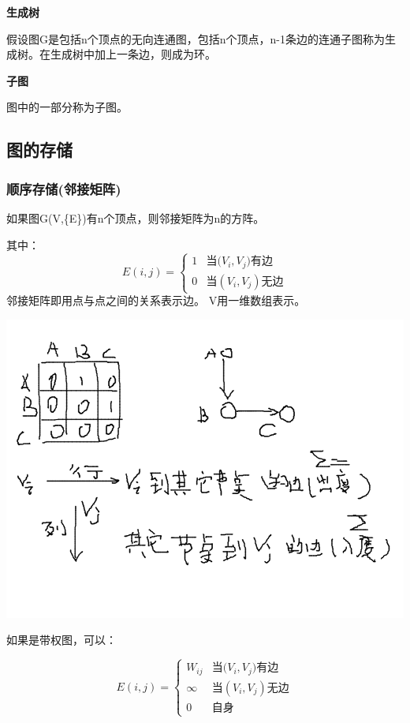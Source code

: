 \documentclass{article}
\begin{document}
		\textbf{生成树}

		假设图G是包括n个顶点的无向连通图，包括n个顶点，n-1条边的连通子图称为生成树。在生成树中加上一条边，则成为环。

		\textbf{子图}

		图中的一部分称为子图。

	\subsection{图的存储}
	\subsubsection{顺序存储(邻接矩阵)}
		如果图G(V,\{E\})有n个顶点，则邻接矩阵为n的方阵。

		其中：
		\[
			E(i,j)=
			\left\{
				\begin{array}{ll}
					1 & \textrm{当($V_i,V_j)$有边}\\
					0 & \textrm{当$(V_i,V_j)$无边}
				\end{array}
			\right .
		\]
		邻接矩阵即用点与点之间的关系表示边。
		V用一维数组表示。

		\includegraphics[scale=0.4]{./pic/graph-02.png}


		如果是带权图，可以：

		\[
			E(i,j)=
			\left\{
				\begin{array}{ll}
					W_{ij} & \textrm{当($V_i,V_j)$有边}\\
					\infty & \textrm{当$(V_i,V_j)$无边}\\
					0	& \textrm{自身}
				\end{array}
			\right .
		\]
		
\end{document}
